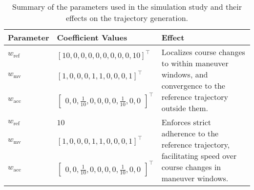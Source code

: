 \begin{table}[htbp]
    \centering
    \begin{tabular}{|l|l|p{5cm}|}
        \hline
        \textbf{Parameter} & \textbf{Coefficient Values} & \textbf{Effect} \\
        \hline
        $w_\text{ref}$ & \rule{0pt}{2.5ex}$[10, 0, 0, 0, 0, 0, 0, 0, 0, 10]^\top$ & \multirow{3}{5cm}{Localizes course changes to within maneuver windows, and convergence to the reference trajectory outside them.} \\
        $w_\text{mv}$ & $[1, 0, 0, 0, 1, 1, 0, 0, 0, 1]^\top$ &  \\
        $w_\text{acc}$ & $\begin{bmatrix}0, 0, \frac{1}{10}, 0, 0, 0, 0, \frac{1}{10}, 0, 0\end{bmatrix}^\top$ & \\[2.5ex]
        \hline
        $w_\text{ref}$ & \rule{0pt}{2.5ex}$10$ & \multirow{3}{5cm}{Enforces strict adherence to the reference trajectory, facilitating speed over course changes in maneuver windows.} \\
        $w_\text{mv}$ & $[1, 0, 0, 0, 1, 1, 0, 0, 0, 1]^\top$ & \\
        $w_\text{acc}$ & $\begin{bmatrix}0, 0, \frac{1}{10}, 0, 0, 0, 0, \frac{1}{10}, 0, 0\end{bmatrix}^\top$ & \\[2.5ex]
        \hline
    \end{tabular}
    \caption{Summary of the parameters used in the simulation study and their effects on the trajectory generation.}
    \label{tab:simulation-parameters-summary}
\end{table}
